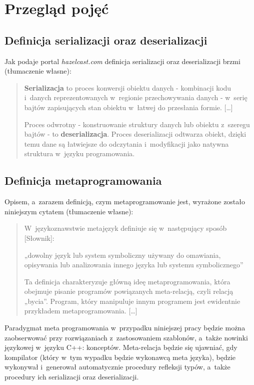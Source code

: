 \documentclass[12pt]{article}
\newcommand{\n}{\newline}
\newcommand{\nonpl}[1]{{\it #1}}
\begin{document}
	{
		\section{Przegląd pojęć}

		{
			\subsection{Definicja serializacji oraz deserializacji}

			Jak podaje portal \nonpl{hazelcast.com}\cite{definitions_serial_and_deserial} definicja serializacji oraz deserializacji brzmi (tłumaczenie własne):

			\begin{quotation}
				{\bf Serializacja} to proces konwersji obiektu danych - kombinacji kodu i~danych
				reprezentowanych w~regionie przechowywania danych - w~serię bajtów zapisujących
				stan obiektu w~łatwej do przesłania formie. [\ldots] \n

				Proces odwrotny - konstruowanie struktury danych lub obiektu z~szeregu
				bajtów - to {\bf deserializacja}. Proces deserializacji odtwarza obiekt,
				dzięki temu dane są łatwiejsze do odczytania i~modyfikacji jako
				natywna struktura w~języku programowania.
			\end{quotation}
		}

		{
			\subsection{Definicja metaprogramowania}

			Opisem, a~zarazem definicją, czym metaprogramowanie jest, wyrażone zostało niniejszym cytatem \cite{metaprogramming_definition} (tłumaczenie własne):

			\begin{quotation}
				W~językoznawstwie metajęzyk definiuje się w~następujący sposób [Słownik]:\n

				„dowolny język lub system symboliczny używany do omawiania, opisywania lub analizowania
				innego języka lub systemu symbolicznego”\n

				Ta definicja charakteryzuje główną ideę metaprogramowania, która obejmuje pisanie
				programów powiązanych meta-relacją, czyli relacją „bycia”. Program, który
				manipuluje innym programem jest ewidentnie przykładem metaprogramowania. [\ldots]
			\end{quotation}

			Paradygmat meta programowania w~przypadku niniejszej pracy będzie można zaobserwować przy
			rozwiązaniach z~zastosowaniem szablonów, a~także nowinki językowej w~języku C++: konceptów.
			Meta-relacja będzie się ujawniać, gdy kompilator (który w~tym wypadku będzie wykonawcą meta języka),
			będzie wykonywał i~generował automatycznie procedury refleksji typów, a~także procedury ich serializacji
			oraz deserializacji.\n
		}

}
\end{document}
